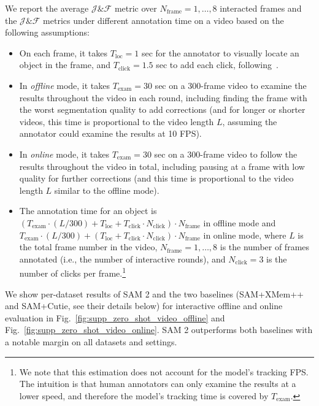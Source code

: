 \documentclass[]{fairmeta}
\newcommand{\figref}[1]{Fig.~\ref{#1}}
\begin{document}
We report the average $\mathcal{J}\&\mathcal{F}$ metric over $N_\mathrm{frame}=1,\ldots,8$ interacted frames and the $\mathcal{J}\&\mathcal{F}$ metrics under different annotation time on a video based on the following assumptions: 
\begin{itemize}
    \item On each frame, it takes $T_\mathrm{loc}=1$ sec for the annotator to visually locate an object in the frame, and $T_\mathrm{click}=1.5$ sec to add each click, following~\citet{delatolas2024learning}.
    \item In \textit{offline} mode, it takes $T_\mathrm{exam} = 30$ sec on a 300-frame video to examine the results throughout the video in each round, including finding the frame with the worst segmentation quality to add corrections (and for longer or shorter videos, this time is proportional to the video length $L$, assuming the annotator could examine the results at 10 FPS).
    \item In \textit{online} mode, it takes $T_\mathrm{exam} = 30$ sec on a 300-frame video to follow the results throughout the video in total, including pausing at a frame with low quality for further corrections (and this time is proportional to the video length $L$ similar to the offline mode).
    \item The annotation time for an object is $\left(T_\mathrm{exam} \cdot \left(L/300\right) + T_\mathrm{loc} + T_\mathrm{click} \cdot N_\mathrm{click}\right) \cdot N_\mathrm{frame}$ in offline mode and $T_\mathrm{exam} \cdot \left(L/300\right) + \left(T_\mathrm{loc} + T_\mathrm{click} \cdot N_\mathrm{click}\right) \cdot N_\mathrm{frame}$ in online mode, where $L$ is the total frame number in the video, $N_\mathrm{frame}=1,\ldots,8$ is the number of frames annotated (i.e., the number of interactive rounds), and $N_\mathrm{click}=3$ is the number of clicks per frame.\footnote{We note that this estimation does not account for the model's tracking FPS. The intuition is that human annotators can only examine the results at a lower speed, and therefore the model's tracking time is covered by $T_\mathrm{exam}$.}
\end{itemize}

We show per-dataset results of SAM 2 and the two baselines (SAM+XMem++ and SAM+Cutie, see their details below) for interactive offline and online evaluation in \figref{fig:supp_zero_shot_video_offline} and \figref{fig:supp_zero_shot_video_online}. SAM 2 outperforms both baselines with a notable margin on all datasets and settings.
\end{document}
